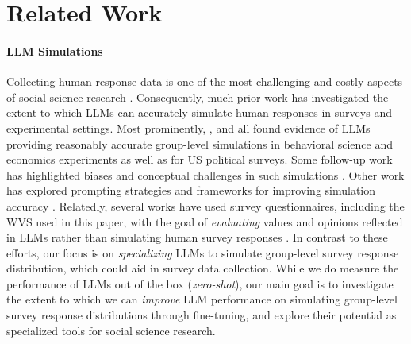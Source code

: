 \section{Related Work}

\paragraph{LLM Simulations}
Collecting human response data is one of the most challenging and costly aspects of social science research \cite{argyle2023out,hewitt2024predicting}.
Consequently, much prior work has investigated the extent to which LLMs can accurately simulate human responses in surveys and experimental settings.
Most prominently, \citet{argyle2023out},  \citet{horton2023large} and \citet{aher2023using} all found evidence of LLMs providing reasonably accurate group-level simulations in behavioral science and economics experiments as well as for US political surveys.
Some follow-up work has highlighted biases and conceptual challenges in such simulations \citep{bisbee2023synthetic,bail2024can,park2024diminished,kozlowski2024simulating}.
Other work has explored prompting strategies and frameworks for improving simulation accuracy \citep{kwok2024evaluating,manning2024automated,sun2024random}.
Relatedly, several works have used survey questionnaires, including the WVS used in this paper, with the goal of \textit{evaluating} values and opinions reflected in LLMs rather than simulating human survey responses \citep[][inter alia]{benkler2023assessing,arora-etal-2023-probing,cao-etal-2023-assessing,alkhamissi-etal-2024-investigating,zhao2024worldvaluesbench,wright2024revealingfinegrainedvaluesopinions}.
In contrast to these efforts, our focus is on \textit{specializing} LLMs to simulate group-level survey response distribution, which could aid in survey data collection.
While we do measure the performance of LLMs out of the box (\textit{zero-shot}), our main goal is to investigate the extent to which we can \textit{improve} LLM performance on simulating group-level survey response distributions through fine-tuning, and explore their potential as specialized tools for social science research.



